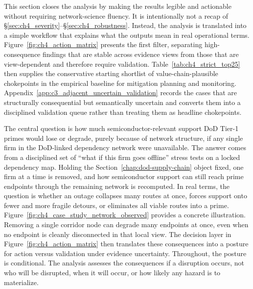This section closes the analysis by making the results legible and actionable without requiring network-science fluency. It is intentionally not a recap of \S\ref{sec:ch4_severity}--\S\ref{sec:ch4_robustness}. Instead, the analysis is translated into a simple workflow that explains what the outputs mean in real operational terms. Figure~\ref{fig:ch4_action_matrix} presents the first filter, separating high-consequence findings that are stable across evidence views from those that are view-dependent and therefore require validation. Table~\ref{tab:ch4_strict_top25} then supplies the conservative starting shortlist of value-chain-plausible chokepoints in the empirical baseline for mitigation planning and monitoring. Appendix~\ref{app:c3_adjacent_uncertain_validation} records the cases that are structurally consequential but semantically uncertain and converts them into a disciplined validation queue rather than treating them as headline chokepoints.

The central question is how much semiconductor-relevant support DoD Tier-1 primes would lose or degrade, purely because of network structure, if any single firm in the DoD-linked dependency network were unavailable. The answer comes from a disciplined set of ``what if this firm goes offline'' stress tests on a locked dependency map. Holding the Section~\ref{chap:dod-supply-chain} object fixed, one firm at a time is removed, and how semiconductor support can still reach prime endpoints through the remaining network is recomputed. In real terms, the question is whether an outage collapses many routes at once, forces support onto fewer and more fragile detours, or eliminates all viable routes into a prime. Figure~\ref{fig:ch4_case_study_network_observed} provides a concrete illustration. Removing a single corridor node can degrade many endpoints at once, even when no endpoint is cleanly disconnected in that local view. The decision layer in Figure~\ref{fig:ch4_action_matrix} then translates these consequences into a posture for action versus validation under evidence uncertainty. Throughout, the posture is conditional. The analysis assesses the consequences if a disruption occurs, not who will be disrupted, when it will occur, or how likely any hazard is to materialize.

